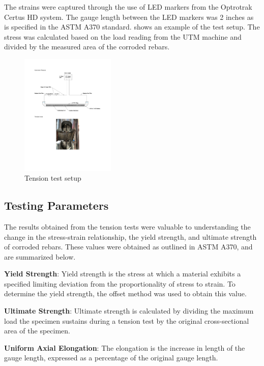 The strains were captured through the use of LED markers from the Optrotrak Certus HD system. The gauge length between the LED markers was 2 inches as is specified in the ASTM A370 standard.  shows an example of the test setup. The stress was calculated based on the load reading from the UTM machine and divided by the measured area of the corroded rebars.

\begin{figure}[htbp]
	\centering
	\includegraphics[width=0.4\textwidth]{VAC Thesis 2.0/Chapter-3/figs/tension_test_utm.pdf}
	\caption{Tension test setup}
	\label{fig:TensionTest}
\end{figure}

\subsection{Testing Parameters}
The results obtained from the tension tests were valuable to understanding the change in the stress-strain relationship, the yield strength, and ultimate strength of corroded rebars. These values were obtained as outlined in ASTM A370, and are summarized below.

\textbf{Yield Strength}: Yield strength is the stress at which a material exhibits a specified limiting deviation from the proportionality of stress to strain. To determine the yield strength, the offset method was used to obtain this value.

\textbf{Ultimate Strength}: Ultimate strength is calculated by dividing the maximum load the specimen sustains during a tension test by the original cross-sectional area of the specimen.

\textbf{Uniform Axial Elongation}: The elongation is the increase in length of the gauge length, expressed as a percentage of the original gauge length.


